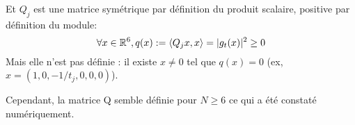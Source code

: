 Et $Q_j$ est une matrice symétrique par définition du produit scalaire, positive par définition du module:
\[
\forall x \in \mathbb R^6, q(x) := \left<Q_jx,x\right> = |g_t(x)|^2 \ge 0
\]
Mais elle n'est pas définie : il existe $x \not = 0$ tel que $q(x) = 0$ (ex, $x = (1,0,-1/t_j,0,0,0)$).

Cependant, la matrice Q semble définie pour $N \ge 6$ ce qui a été constaté numériquement.








